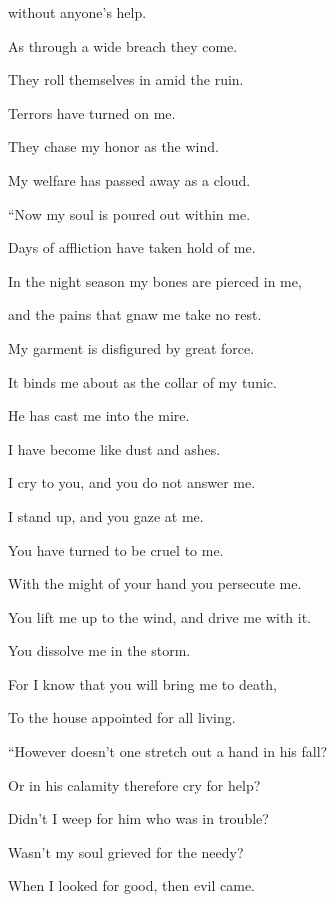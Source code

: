{\par }{\QB without anyone’s help.
\par }{\Q {}As through a wide breach they come.
\par }{\QB They roll themselves in amid the ruin.
\par }{\Q {}Terrors have turned on me.
\par }{\QB They chase my honor as the wind.
\par }{\QB My welfare has passed away as a cloud.
\par }{\BB \par }{\Q {}“Now my soul is poured out within me.
\par }{\QB Days of affliction have taken hold of me.
\par }{\Q {}In the night season my bones are pierced in me,
\par }{\QB and the pains that gnaw me take no rest.
\par }{\Q {}My garment is disfigured by great force.
\par }{\QB It binds me about as the collar of my tunic.
\par }{\Q {}He has cast me into the mire.
\par }{\QB I have become like dust and ashes.
\par }{\Q {}I cry to you, and you do not answer me.
\par }{\QB I stand up, and you gaze at me.
\par }{\Q {}You have turned to be cruel to me.
\par }{\QB With the might of your hand you persecute me.
\par }{\Q {}You lift me up to the wind, and drive me with it.
\par }{\QB You dissolve me in the storm.
\par }{\Q {}For I know that you will bring me to death,
\par }{\QB To the house appointed for all living.
\par }{\BB \par }{\Q {}“However doesn’t one stretch out a hand in his fall?
\par }{\QB Or in his calamity therefore cry for help?
\par }{\Q {}Didn’t I weep for him who was in trouble?
\par }{\QB Wasn’t my soul grieved for the needy?
\par }{\Q {}When I looked for good, then evil came.
}
